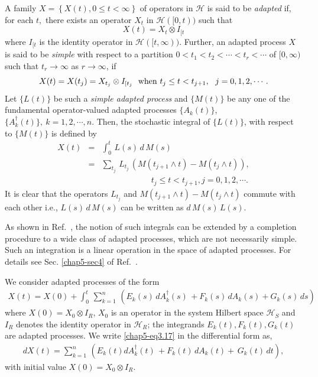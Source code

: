 A family $X = \left \{ X(t), 0 \leq t < \infty \right \}$ of operators in  $\mathcal{H}$ is said to be {\it adapted} if, for each $t,$ there exists an operator $X_t$ in $\mathcal{H}([0,t))$ such that 
$$
X(t) = X_t \otimes I_{[t}
$$ 
where $I_{[t}$ is the identity operator in $\mathcal{H}([t,\infty)).$  Further, an adapted process $X$ is said to be {\it simple} with respect to a partition $0 < t_1 < t_2 < \cdots < t_r < \cdots $ of $[0, \infty)$ such that $t_r \rightarrow \infty$ as $r \rightarrow \infty$, if 
\begin{equation}
X(t)=X({t_j})=X_{t_j} \otimes I_{[t_j} \ \  {\rm when}\ t_j\leq t<t_{j+1},\ \ j=0,1,2,\cdots .  \label{chap5-eq15}
\end{equation}
Let $\{L(t)\}$ be such a {\it simple adapted process} and $\{M(t)\}$ be any one of the fundamental operator-valued adapted processes $\{A_k(t)\}$, $\{A_k^\dag(t)\},\ k=1,2,\cdots , n$. Then,  the stochastic integral of   $\{L(t)\}$, with respect to  $\{M(t)\}$  is defined by  
\begin{eqnarray}
		X(t)&=&\int_{0}^t\,  L(s)\, d\, M(s)  \nonumber \\
		&=&\sum_{t_j}\, L_{t_j}\, \left( M (t_{j+1} \wedge t)- M (t_{j} \wedge t)\right),  \nonumber\\ 
		&&\qquad \qquad \qquad  t_j\leq t<t_{j+1},  j=0,1,2,\cdots . \label{chap5-eq3.16} 
\end{eqnarray}
It is clear that the operators $L_{t_j}$ and  $M (t_{j+1} \wedge t)- M (t_{j} \wedge t)$ commute with each other i.e., $ L(s)\, d\, M(s)$ can be written as $d\, M(s)\, L(s).$ 

As shown in Ref.~\cite{key7}, the notion of such integrals can be extended by a completion procedure to a wide class of adapted processes, which are not necessarily simple. Such an integration is a linear operation in the space of adapted processes.  For details see Sec. \ref{chap5-sec4} of Ref.~\cite{key7}. 

We consider adapted processes of the form  
\begin{eqnarray}
		X(t)=X(0)+ \int_0^t\, \sum_{k=1}^n\, \left(E_{k}(s)\, dA^\dag_k(s)\, + F_{k}(s)\, dA_k(s)+ G_{k}(s)\, ds\right)  \label{chap5-eq3.17}
\end{eqnarray}    
where $X(0)=X_0\otimes I_R$,  $X_0$ is an operator in the system Hilbert space $\mathcal{H}_S$ and $I_R$ denotes the identity operator in $\mathcal{H}_R$; the integrands $E_k(t), F_k(t), G_k(t)$ are adapted processes. 
We write \eqref{chap5-eq3.17}  in the differential form as, 
\begin{eqnarray}
		dX(t)=\sum_{k=1}^n\, \left( E_{k}(t) dA^\dag_k(t)\, + F_{k}(t)\, dA_k(t)+\,  G_{k}(t)\, dt\right),  \label{chap5-eq3.18}
\end{eqnarray}    
with initial value $X(0)=X_0\otimes I_R$. 

